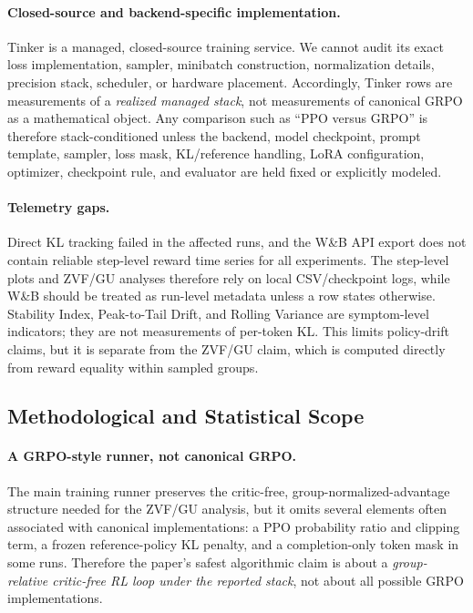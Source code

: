 \paragraph{Closed-source and backend-specific implementation.}
Tinker is a managed, closed-source training service.  We cannot audit its exact
loss implementation, sampler, minibatch construction, normalization details,
precision stack, scheduler, or hardware placement.  Accordingly, Tinker rows are
measurements of a \emph{realized managed stack}, not measurements of canonical
GRPO as a mathematical object.  Any comparison such as ``PPO versus GRPO'' is
therefore stack-conditioned unless the backend, model checkpoint, prompt
template, sampler, loss mask, KL/reference handling, LoRA configuration,
optimizer, checkpoint rule, and evaluator are held fixed or explicitly modeled.

\paragraph{Telemetry gaps.}
Direct KL tracking failed in the affected runs, and the W\&B API export does
not contain reliable step-level reward time series for all experiments.  The
step-level plots and ZVF/GU analyses therefore rely on local CSV/checkpoint
logs, while W\&B should be treated as run-level metadata unless a row states
otherwise.  Stability Index, Peak-to-Tail Drift, and Rolling Variance are
symptom-level indicators; they are not measurements of per-token
KL.  This limits policy-drift claims, but it is separate from the ZVF/GU claim,
which is computed directly from reward equality within sampled groups.

\subsection{Methodological and Statistical Scope}
\label{sec:method_limits}

\paragraph{A GRPO-style runner, not canonical GRPO.}
The main training runner preserves the critic-free, group-normalized-advantage
structure needed for the ZVF/GU analysis, but it omits several elements often
associated with canonical implementations: a PPO probability ratio and clipping
term, a frozen reference-policy KL penalty, and a completion-only token mask in
some runs.  Therefore the paper's safest algorithmic claim is about a
\emph{group-relative critic-free RL loop under the reported stack}, not about all
possible GRPO implementations.

